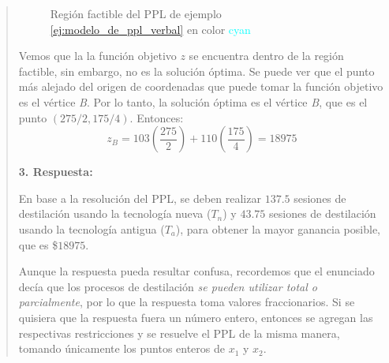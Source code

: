 \begin{quote}
\begin{figure}[ht]
    \caption{Región factible del PPL de ejemplo \ref{ej:modelo_de_ppl_verbal} en color \textcolor{cyan}{cyan}}
    \label{fig:ppl-maximizacion}
  \end{figure}

  Vemos que la la función objetivo \(z\) se encuentra dentro de la región factible, sin embargo, no es la solución óptima. Se puede ver que el punto más alejado del origen de coordenadas que puede tomar la función objetivo es el vértice \textit{B}. Por lo tanto, la solución óptima es el vértice \textit{B}, que es el punto \(\left(275/2,175/4\right)\). Entonces:
  \[
    z_B = 103\left(\frac{275}{2}\right) + 110\left(\frac{175}{4}\right) = \boxed{18975}
  \]

  \textbf{3. Respuesta:}

  En base a la resolución del PPL, se deben realizar \(137.5\) sesiones de destilación usando la tecnología nueva (\(T_n\)) y \(43.75\) sesiones de destilación usando la tecnología antigua (\(T_a\)), para obtener la mayor ganancia posible, que es \$\(18975\).

  \begin{tcolorbox}[remember]
    Aunque la respuesta pueda resultar confusa, recordemos que el enunciado decía que los procesos de destilación \textit{se pueden utilizar total o parcialmente}, por lo que la respuesta toma valores fraccionarios. Si se quisiera que la respuesta fuera un número entero, entonces se agregan las respectivas restricciones y se resuelve el PPL de la misma manera, tomando únicamente los puntos enteros de \(x_1\) y \(x_2\).
  \end{tcolorbox}

\end{quote}

